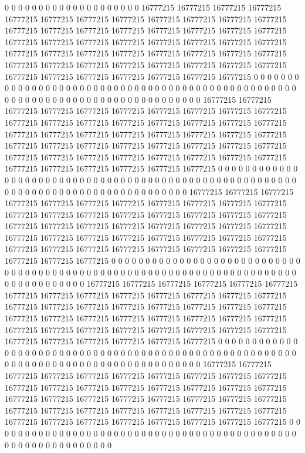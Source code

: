 0 0 0 0 0 0 0 0 0 0 0 0 0 0 0 0 0 0 0 0 16777215 16777215 16777215 16777215 16777215 16777215 16777215 16777215 16777215 16777215 16777215 16777215 16777215 16777215 16777215 16777215 16777215 16777215 16777215 16777215 16777215 16777215 16777215 16777215 16777215 16777215 16777215 16777215 16777215 16777215 16777215 16777215 16777215 16777215 16777215 16777215 16777215 16777215 16777215 16777215 16777215 16777215 16777215 16777215 16777215 16777215 16777215 16777215 16777215 16777215 16777215 0 0 0 0 0 0 0 0 0 0 0 0 0 0 0 0 0 0 0 0 0 0 0 0 0 0 0 0 0 0 0 0 0 0 0 0 0 0 0 0 0 0 0 0 0 0 0 0 0 0 0 0 0 0 0 0 0
0 0 0 0 0 0 0 0 0 0 0 0 0 0 0 0 0 0 0 0 0 0 16777215 16777215 16777215 16777215 16777215 16777215 16777215 16777215 16777215 16777215 16777215 16777215 16777215 16777215 16777215 16777215 16777215 16777215 16777215 16777215 16777215 16777215 16777215 16777215 16777215 16777215 16777215 16777215 16777215 16777215 16777215 16777215 16777215 16777215 16777215 16777215 16777215 16777215 16777215 16777215 16777215 16777215 16777215 16777215 16777215 16777215 16777215 16777215 0 0 0 0 0 0 0 0 0 0 0 0 0 0 0 0 0 0 0 0 0 0 0 0 0 0 0 0 0 0 0 0 0 0 0 0 0 0 0 0 0 0 0 0 0 0 0 0 0 0 0 0 0 0 0 0 0 0
0 0 0 0 0 0 0 0 0 0 0 0 0 0 0 0 0 0 0 0 0 0 0 0 16777215 16777215 16777215 16777215 16777215 16777215 16777215 16777215 16777215 16777215 16777215 16777215 16777215 16777215 16777215 16777215 16777215 16777215 16777215 16777215 16777215 16777215 16777215 16777215 16777215 16777215 16777215 16777215 16777215 16777215 16777215 16777215 16777215 16777215 16777215 16777215 16777215 16777215 16777215 16777215 16777215 16777215 16777215 16777215 16777215 16777215 0 0 0 0 0 0 0 0 0 0 0 0 0 0 0 0 0 0 0 0 0 0 0 0 0 0 0 0 0 0 0 0 0 0 0 0 0 0 0 0 0 0 0 0 0 0 0 0 0 0 0 0 0 0 0 0 0 0
0 0 0 0 0 0 0 0 0 0 0 0 0 0 0 0 0 0 0 0 0 0 0 0 0 16777215 16777215 16777215 16777215 16777215 16777215 16777215 16777215 16777215 16777215 16777215 16777215 16777215 16777215 16777215 16777215 16777215 16777215 16777215 16777215 16777215 16777215 16777215 16777215 16777215 16777215 16777215 16777215 16777215 16777215 16777215 16777215 16777215 16777215 16777215 16777215 16777215 16777215 16777215 16777215 16777215 16777215 16777215 16777215 0 0 0 0 0 0 0 0 0 0 0 0 0 0 0 0 0 0 0 0 0 0 0 0 0 0 0 0 0 0 0 0 0 0 0 0 0 0 0 0 0 0 0 0 0 0 0 0 0 0 0 0 0 0 0 0 0 0 0
0 0 0 0 0 0 0 0 0 0 0 0 0 0 0 0 0 0 0 0 0 0 0 0 0 16777215 16777215 16777215 16777215 16777215 16777215 16777215 16777215 16777215 16777215 16777215 16777215 16777215 16777215 16777215 16777215 16777215 16777215 16777215 16777215 16777215 16777215 16777215 16777215 16777215 16777215 16777215 16777215 16777215 16777215 16777215 16777215 16777215 16777215 16777215 16777215 16777215 16777215 16777215 16777215 16777215 16777215 0 0 0 0 0 0 0 0 0 0 0 0 0 0 0 0 0 0 0 0 0 0 0 0 0 0 0 0 0 0 0 0 0 0 0 0 0 0 0 0 0 0 0 0 0 0 0 0 0 0 0 0 0 0 0 0 0 0 0 0 0
